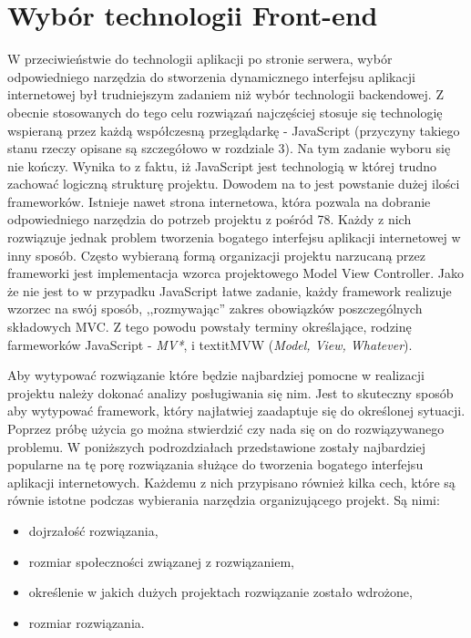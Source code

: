 \section{Wybór technologii Front-end}

W przeciwieństwie do technologii aplikacji po stronie serwera, wybór odpowiedniego narzędzia do stworzenia dynamicznego interfejsu aplikacji internetowej był trudniejszym zadaniem niż wybór technologii backendowej. Z obecnie stosowanych do tego celu rozwiązań najczęściej stosuje się technologię wspieraną przez każdą współczesną przeglądarkę - JavaScript\cite{javascript-book} (przyczyny takiego stanu rzeczy opisane są szczegółowo w rozdziale 3). Na tym zadanie wyboru się nie kończy. Wynika to z faktu, iż JavaScript jest technologią w której trudno zachować logiczną strukturę projektu. Dowodem na to jest powstanie dużej ilości frameworków. Istnieje nawet strona internetowa, która pozwala na dobranie odpowiedniego narzędzia do potrzeb projektu z pośród 78\cite{todomvc}. Każdy z nich rozwiązuje jednak problem tworzenia bogatego interfejsu aplikacji internetowej w inny sposób. Często wybieraną formą organizacji projektu narzucaną przez frameworki jest implementacja wzorca projektowego Model View Controller. Jako że nie jest to w przypadku JavaScript łatwe zadanie, każdy framework realizuje wzorzec na swój sposób, ,,rozmywając'' zakres obowiązków poszczególnych składowych MVC. Z tego powodu powstały terminy określające, rodzinę farmeworków JavaScript - \textit{MV*}, i textit{MVW} (\textit{Model, View, Whatever}). 

Aby wytypować rozwiązanie które będzie najbardziej pomocne w realizacji projektu należy dokonać analizy posługiwania się nim. Jest to skuteczny sposób aby wytypować framework, który najłatwiej zaadaptuje się do określonej sytuacji\cite{todomvc}. Poprzez próbę użycia go można stwierdzić czy nada się on do rozwiązywanego problemu. 
W poniższych podrozdziałach przedstawione zostały najbardziej popularne na tę porę rozwiązania służące do tworzenia bogatego interfejsu aplikacji internetowych. Każdemu z nich przypisano również kilka cech, które są równie istotne podczas wybierania narzędzia organizującego projekt. Są nimi:
\begin{itemize}
\item dojrzałość rozwiązania,
\item rozmiar społeczności związanej z rozwiązaniem,
\item określenie w jakich dużych projektach rozwiązanie zostało wdrożone,
\item rozmiar rozwiązania.
\end{itemize}

